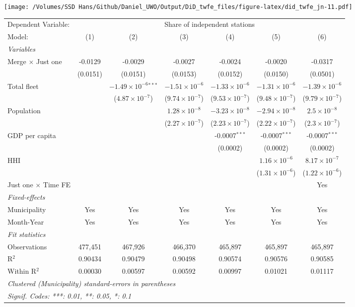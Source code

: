 \documentclass[
]{article}
\begin{document}
\texttt{[image: /Volumes/SSD Hans/Github/Daniel\_UWO/Output/DiD\_twfe\_files/figure-latex/did\_twfe\_jn-11.pdf]}

\begin{tabular}{lcccccc}
\tabularnewline\midrule\midrule
Dependent Variable:&\multicolumn{6}{c}{Share of independent stations}\\
Model:&(1) & (2) & (3) & (4) & (5) & (6)\\
\midrule \emph{Variables}&   &   &   &   &   &  \\
Merge $\times $ Just one & -0.0129 & -0.0029 & -0.0027 & -0.0024 & -0.0020 & -0.0317\\
  &(0.0151) & (0.0151) & (0.0153) & (0.0152) & (0.0150) & (0.0501)\\
Total fleet &    & $-1.49\times 10^{-6}$$^{***}$ & $-1.51\times 10^{-6}$ & $-1.33\times 10^{-6}$ & $-1.31\times 10^{-6}$ & $-1.39\times 10^{-6}$\\
  &   & ($4.87\times 10^{-7}$) & ($9.74\times 10^{-7}$) & ($9.53\times 10^{-7}$) & ($9.48\times 10^{-7}$) & ($9.79\times 10^{-7}$)\\
Population &    &    & $1.28\times 10^{-8}$ & $-3.23\times 10^{-8}$ & $-2.94\times 10^{-8}$ & $2.5\times 10^{-8}$\\
  &   &    & ($2.27\times 10^{-7}$) & ($2.23\times 10^{-7}$) & ($2.22\times 10^{-7}$) & ($2.3\times 10^{-7}$)\\
GDP per capita &    &    &    & -0.0007$^{***}$ & -0.0007$^{***}$ & -0.0007$^{***}$\\
  &   &    &    & (0.0002) & (0.0002) & (0.0002)\\
HHI &    &    &    &    & $1.16\times 10^{-6}$ & $8.17\times 10^{-7}$\\
  &   &    &    &    & ($1.31\times 10^{-6}$) & ($1.22\times 10^{-6}$)\\
Just one $\times$ Time FE &  &  &  &  &  & Yes\\
\midrule \emph{Fixed-effects}&   &   &   &   &   &  \\
Municipality & Yes & Yes & Yes & Yes & Yes & Yes\\
Month-Year & Yes & Yes & Yes & Yes & Yes & Yes\\
\midrule \emph{Fit statistics}&  & & & & & \\
Observations & 477,451&467,926&466,370&465,897&465,897&465,897\\
R$^2$ & 0.90434&0.90479&0.90498&0.90574&0.90576&0.90585\\
Within R$^2$ & 0.00030&0.00597&0.00592&0.00997&0.01021&0.01117\\
\midrule\midrule\multicolumn{7}{l}{\emph{Clustered (Municipality) standard-errors in parentheses}}\\
\multicolumn{7}{l}{\emph{Signif. Codes: ***: 0.01, **: 0.05, *: 0.1}}\\
\end{tabular}
\end{document}
